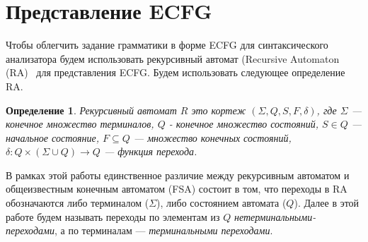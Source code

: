 \documentclass[14pt]{matmex-diploma-custom}
\newtheorem{mydef}{Определение}
\begin{document}
	
	\section{Представление ECFG}
	
	Чтобы облегчить задание грамматики в форме ECFG для синтаксического анализатора
	будем использовать рекурсивный автомат (Recursive Automaton (RA)~\cite{tellier2006learning}
	для представления ECFG. Будем использовать следующее определение RA.
	\begin{mydef}
		Рекурсивный автомат $R$ это кортеж $(\Sigma, Q, S, F, \delta)$, где $\Sigma$
		--- конечное множество терминалов, $Q$ - конечное множество состояний, $S \in Q$ 
		--- начальное состояние, $F \subseteq Q$ --- множество конечных состояний,
		$\delta : Q \times (\Sigma \cup Q) \to Q$ --- функция перехода.
	\end{mydef}
	В рамках этой работы единственное различие между рекурсивным автоматом и общеизвестным
	конечным автоматом (FSA) состоит в том, что переходы в RA обозначаются либо терминалом ($\Sigma$),
	либо состоянием автомата ($Q$). Далее в этой работе будем называть переходы по элементам из
	$Q$ \textit{нетерминальными-переходами}, а по терминалам --- \textit{терминальными переходами}.
	
\end{document}
